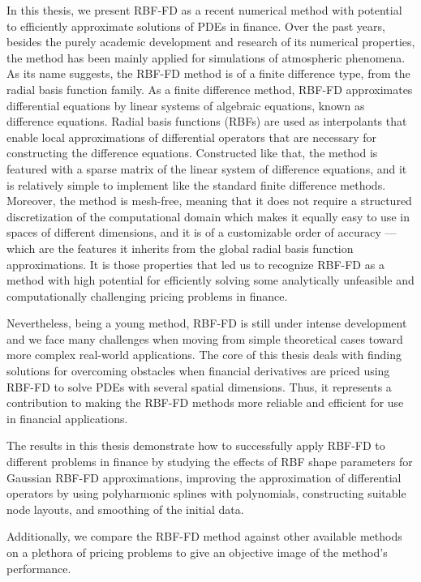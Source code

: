 \documentclass{UUThesisTemplate}
\begin{document}
{\par In this thesis, we present RBF-FD as a recent numerical method with potential to efficiently approximate solutions of PDEs in finance. Over the past years, besides the purely academic development and research of its numerical properties, the method has been mainly applied for simulations of atmospheric phenomena. As its name suggests, the RBF-FD method is of a finite difference type, from the radial basis function family. As a finite difference method, RBF-FD approximates differential equations by linear systems of algebraic equations, known as difference equations. Radial basis functions (RBFs) are used as interpolants that enable local approximations of differential operators that are necessary for constructing the difference equations. Constructed like that, the method is featured with a sparse matrix of the linear system of difference equations, and it is relatively simple to implement like the standard finite difference methods. Moreover, the method is mesh-free, meaning that it does not require a structured discretization of the computational domain which makes it equally easy to use in spaces of different dimensions, and it is of a customizable order of accuracy --- which are the features it inherits from the global radial basis function approximations. It is those properties that led us to recognize RBF-FD as a method with high potential for efficiently solving some analytically unfeasible and computationally challenging pricing problems in finance.
\par Nevertheless, being a young method, RBF-FD is still under intense development and we face many challenges when moving from simple theoretical cases toward more complex real-world applications. The core of this thesis deals with finding solutions for overcoming obstacles when financial derivatives are priced using RBF-FD to solve PDEs with several spatial dimensions. Thus, it represents a contribution to making the RBF-FD methods more reliable and efficient for use in financial applications. 
\par The results in this thesis demonstrate how to successfully apply RBF-FD to different problems in finance by studying the effects of RBF shape parameters for Gaussian RBF-FD approximations, improving the approximation of differential operators by using polyharmonic splines with polynomials, constructing suitable node layouts, and smoothing of the initial data.
\par Additionally, we compare the RBF-FD method against other available methods on a plethora of pricing problems to give an objective image of the method's performance.
}
\end{document}
